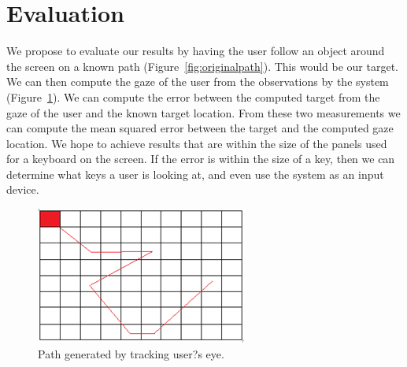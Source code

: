 \documentclass[10pt,twocolumn,letterpaper]{article}
\begin{document}
\section{Evaluation}
We propose to evaluate our results by having the user follow an object
around the screen on a known path (Figure~\ref{fig:originalpath}). 
This would be our target. We can then compute the gaze of the user from 
the observations by the system (Figure~\ref{fig:generatedpath}). We can compute the error between the computed target from the
gaze of the user and the known target location. From these two
measurements we can compute the mean squared error between the target
and the computed gaze location. We hope to achieve results that are
within the size of the panels used for a keyboard on the screen. If
the error is within the size of a key, then we can determine what keys
a user is looking at, and even use the system as an input device.


\begin{figure}
  \begin{center}
    \includegraphics[width=\linewidth]{predicted_object_path}
  \end{center}
  \caption{Path generated by tracking user?s eye.}
  \label{fig:generatedpath}
\end{figure}
\end{document}

